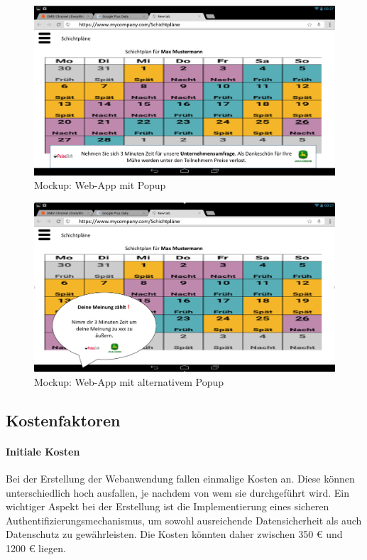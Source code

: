 \begin{figure}[H] 
\centering 
\includegraphics[scale=0.3]{images/lunchapp_mockups/mockup3} 
\caption[Mockup: Web-App mit Popup]{Mockup: Web-App mit Popup} 
\label{wamu2} 
\end{figure}

\begin{figure}[H] 
\centering 
\includegraphics[scale=0.3]{images/lunchapp_mockups/mockup2} 
\caption[Mockup: Web-App mit alternativem Popup]{Mockup: Web-App mit alternativem Popup} 
\label{wamu3} 
\end{figure}



\subsection{Kostenfaktoren}

\paragraph{Initiale Kosten}
Bei der Erstellung der Webanwendung fallen einmalige Kosten an. Diese können unterschiedlich hoch ausfallen, je nachdem von wem sie durchgeführt wird. Ein wichtiger Aspekt bei der Erstellung ist die Implementierung eines sicheren Authentifizierungsmechanismus, um sowohl ausreichende Datensicherheit als auch Datenschutz zu gewährleisten. Die Kosten könnten daher zwischen 350 € und 1200 € liegen.

